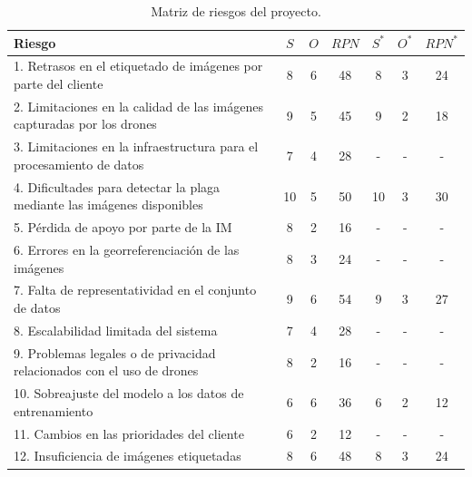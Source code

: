 \documentclass[
11pt, %
]{charter}
\begin{document}
\begin{table}[H]
  \centering
  \begin{tabularx}{\linewidth}{@{}|X|c|c|c|c|c|c|@{}}
    \hline
    \rowcolor[HTML]{C0C0C0}
    Riesgo                                                                   & $S$ & $O$ & $RPN$ & $S^*$ & $O^*$ & $RPN^*$ \\ \hline
    1. Retrasos en el etiquetado de imágenes por parte del cliente           & 8   & 6   & 48    & 8     & 3     & 24      \\ \hline
    2. Limitaciones en la calidad de las imágenes capturadas por los drones  & 9   & 5   & 45    & 9     & 2     & 18      \\ \hline
    3. Limitaciones en la infraestructura para el procesamiento de datos     & 7   & 4   & 28    & -     & -     & -       \\ \hline
    4. Dificultades para detectar la plaga mediante las imágenes disponibles & 10  & 5   & 50    & 10    & 3     & 30      \\ \hline
    5. Pérdida de apoyo por parte de la IM                                   & 8   & 2   & 16    & -     & -     & -       \\ \hline
    6. Errores en la georreferenciación de las imágenes                      & 8   & 3   & 24    & -     & -     & -       \\ \hline
    7. Falta de representatividad en el conjunto de datos                    & 9   & 6   & 54    & 9     & 3     & 27      \\ \hline
    8. Escalabilidad limitada del sistema                                    & 7   & 4   & 28    & -     & -     & -       \\ \hline
    9. Problemas legales o de privacidad relacionados con el uso de drones   & 8   & 2   & 16    & -     & -     & -       \\ \hline
    10. Sobreajuste del modelo a los datos de entrenamiento                  & 6   & 6   & 36    & 6     & 2     & 12      \\ \hline
    11. Cambios en las prioridades del cliente                               & 6   & 2   & 12    & -     & -     & -       \\ \hline
    12. Insuficiencia de imágenes etiquetadas                                & 8   & 6   & 48    & 8     & 3     & 24      \\ \hline
  \end{tabularx}%
  \caption{Matriz de riesgos del proyecto.}
\end{table}
\end{document}
